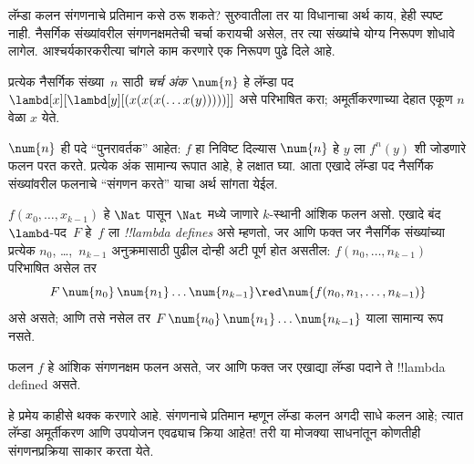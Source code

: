\documentclass[../../../include/open-logic-section]{subfiles}
\begin{document}

लॅम्डा कलन संगणनाचे प्रतिमान कसे ठरू शकते? सुरुवातीला तर या
विधानाचा अर्थ काय, हेही स्पष्ट नाही. नैसर्गिक संख्यांवरील
संगणनक्षमतेची चर्चा करायची असेल, तर त्या संख्यांचे योग्य
निरूपण शोधावे लागेल. आश्चर्यकारकरीत्या चांगले काम करणारे
एक निरूपण पुढे दिले आहे.

\begin{defn}
प्रत्येक नैसर्गिक संख्या~$n$ साठी \emph{चर्च अंक}
$\num{n}$ हे लॅम्डा पद $\lambd[x][\lambd[y][(x(x(x(\dots
x(y)))))]]$ असे परिभाषित करा; अमूर्तीकरणाच्या देहात एकूण $n$ वेळा $x$ येते.
\end{defn}

$\num{n}$ ही पदे “पुनरावर्तक” आहेत: $f$ हा निविष्ट दिल्यास
$\num{n}$ हे $y$ ला $f^n(y)$ शी जोडणारे फलन परत करते.
प्रत्येक अंक सामान्य रूपात आहे, हे लक्षात घ्या. आता
एखादे लॅम्डा पद नैसर्गिक संख्यांवरील फलनाचे “संगणन करते”
याचा अर्थ सांगता येईल.

\begin{defn}
$f(x_0, \dots, x_{k-1})$ हे $\Nat$ पासून $\Nat$ मध्ये
जाणारे $k$-स्थानी आंशिक फलन असो. एखादे बंद $\lambd$-पद~$F$
हे~$f$ ला \emph{!!{lambda define}s} असे म्हणतो, जर आणि फक्त जर
नैसर्गिक संख्यांच्या प्रत्येक $n_0$, \dots,~$n_{k-1}$
अनुक्रमासाठी पुढील दोन्ही अटी पूर्ण होत असतील: $f(n_0, \dots, n_{k-1})$ परिभाषित असेल तर
\[
F\, \num{n_0}\, \num{n_1} \dots \num{n_{k-1}} \red \num{f(n_0, n_1, \dots,
  n_{k-1})}
\]
असे असते; आणि तसे नसेल तर $F\, \num{n_0}\, \num{n_1}
\dots \num{n_{k-1}}$ याला सामान्य रूप नसते.
\end{defn}

\begin{thm}
फलन $f$ हे आंशिक संगणनक्षम फलन असते, जर आणि फक्त जर
एखाद्या लॅम्डा पदाने ते !!{lambda defined} असते.
\end{thm}

\begin{explain}
हे प्रमेय काहीसे थक्क करणारे आहे. संगणनाचे प्रतिमान म्हणून
लॅम्डा कलन अगदी साधे कलन आहे; त्यात लॅम्डा अमूर्तीकरण आणि
उपयोजन एवढ्याच क्रिया आहेत!{} तरी या मोजक्या साधनांतून
कोणतीही संगणनप्रक्रिया साकार करता येते.
\end{explain}
\end{document}
